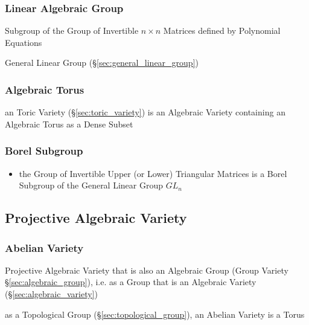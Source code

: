 \subsubsection{Linear Algebraic Group}\label{sec:linear_algebraic_group}

Subgroup of the Group of Invertible $n \times n$ Matrices defined by Polynomial
Equations

General Linear Group (\S\ref{sec:general_linear_group})



\subsubsection{Algebraic Torus}\label{sec:algebraic_torus}

an Toric Variety (\S\ref{sec:toric_variety}) is an Algebraic Variety containing
an Algebraic Torus as a Dense Subset



\subsubsection{Borel Subgroup}\label{sec:borel_subgroup}

\begin{itemize}
  \item the Group of Invertible Upper (or Lower) Triangular Matrices is a Borel
    Subgroup of the General Linear Group $GL_n$
\end{itemize}



\subsection{Projective Algebraic Variety}
\label{sec:projective_algebraic_variety}

\subsubsection{Abelian Variety}\label{sec:abelian_variety}

Projective Algebraic Variety that is also an Algebraic Group (Group Variety
\S\ref{sec:algebraic_group}), i.e. as a Group that is an Algebraic Variety
(\S\ref{sec:algebraic_variety})

as a Topological Group (\S\ref{sec:topological_group}), an Abelian Variety is a
Torus %

